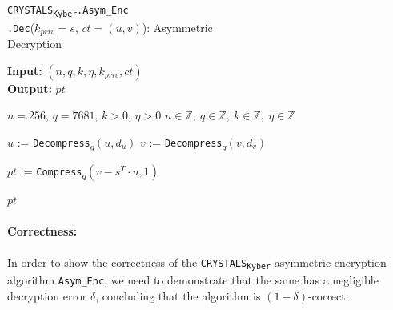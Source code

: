 \documentclass[runningheads]{llncs}
\numberwithin{equation}{section}
\begin{document}
    \vspace{-6ex}
    \begin{algorithm}
        \caption{\texorpdfstring{\texttt{CRYSTALS}\textsubscript{\texttt{Kyber}}\texttt{.Asym\_Enc}\\ \phantom{................................................}\texttt{.Dec}(${k}_{priv} = s$, $ct = (u, v)$)}\/: Asymmetric\\ \phantom{.............................................................................................}Decryption}
        \label{subrou:crystals-kyber-asymmetric-encryption-dec}
        
        \textbf{Input:} $\left( n, q, k, \eta, {k}_{priv}, ct \right)$\\
        \textbf{Output:} $ pt $
  
        \begin{algorithmic}[1]
            \Require $n = 256$, $q = 7681$, $k > 0$, $\eta > 0$
            \Ensure $n \in \mathbb{Z},\ q \in \mathbb{Z},\ k \in \mathbb{Z},\ \eta \in \mathbb{Z}$
            
            \vspace{2ex}
            
            \State $u$ := \texttt{Decompress}\textsubscript{$q$}$(u, {d}_{u})$
            \State $v$ := \texttt{Decompress}\textsubscript{$q$}$(v, {d}_{v})$
            
            \vspace{1ex}

            \State $pt$ := \texttt{Compress}\textsubscript{$q$}$(v - {s}^{T} \cdot u, 1)$
            
            \vspace{1ex}
            
            \State \Return $pt$
        \end{algorithmic}
    \end{algorithm}
    \vspace{-5ex}

    \paragraph{\textbf{Correctness:}} In order to show the correctness of the \texorpdfstring{\texttt{CRYSTALS}\textsubscript{\texttt{Kyber}}}\/ asymmetric encryption algorithm \texttt{Asym\_Enc}, we need to demonstrate that the same has a negligible decryption error $\delta$, concluding that the algorithm is $(1 - \delta)$-correct.
\end{document}
